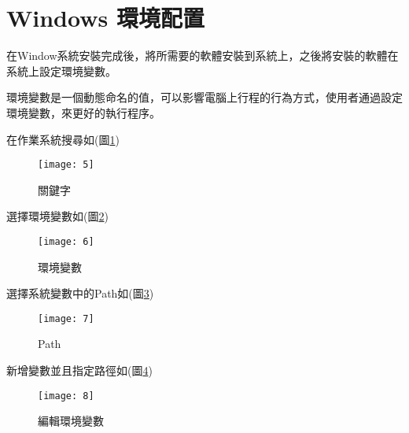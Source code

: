 \section{Windows 環境配置}
\par
\renewcommand{\baselinestretch}{1} %
\twelve 在Window系統安裝完成後，將所需要的軟體安裝到系統上，之後將安裝的軟體在系統上設定環境變數。
\\
\par
\renewcommand{\baselinestretch}{1} %
\twelve 環境變數是一個動態命名的值，可以影響電腦上行程的行為方式，使用者通過設定環境變數，來更好的執行程序。
\\
\par
\renewcommand{\baselinestretch}{1} %
\twelve 在作業系統搜尋如(圖\ref{fig.關鍵字})
\\
\par
\renewcommand{\baselinestretch}{1.7} %
\begin{figure}[hbt!]
\begin{center}
\texttt{[image: 5]}
\caption{\large 關鍵字}\label{fig.關鍵字}
\end{center}
\end{figure}
\par
\renewcommand{\baselinestretch}{1} %
\twelve 選擇環境變數如(圖\ref{fig.環境變數})
\\
\par
\renewcommand{\baselinestretch}{1.7} %
\begin{figure}[hbt!]
\begin{center}
\texttt{[image: 6]}
\caption{\large 環境變數}\label{fig.環境變數}
\end{center}
\end{figure}
\par
\renewcommand{\baselinestretch}{1} %
\twelve 選擇系統變數中的Path如(圖\ref{fig.Path})
\\
\par
\renewcommand{\baselinestretch}{1.7} %
\begin{figure}[hbt!]
\begin{center}
\texttt{[image: 7]}
\caption{\large Path}\label{fig.Path}
\end{center}
\end{figure}
\par
\renewcommand{\baselinestretch}{1} %
\twelve 新增變數並且指定路徑如(圖\ref{fig.編輯環境變數})
\\
\par
\renewcommand{\baselinestretch}{1.7} %
\begin{figure}[hbt!]
\begin{center}
\texttt{[image: 8]}
\caption{\large 編輯環境變數}\label{fig.編輯環境變數}
\end{center}
\end{figure}
\par

